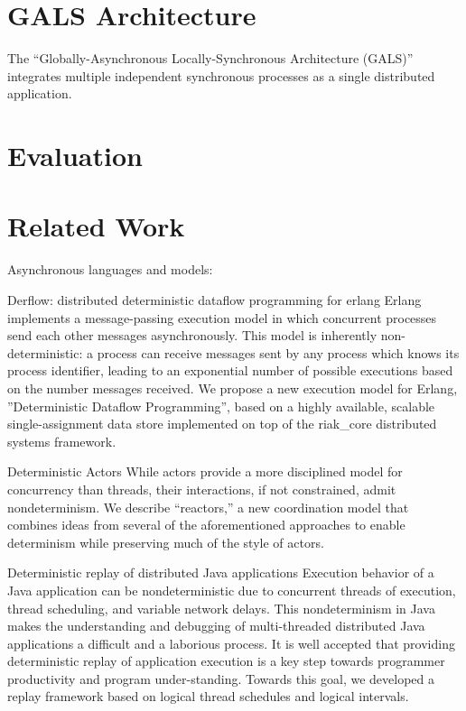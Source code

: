 \documentclass[sigplan,screen]{acmart}
\begin{document}
\section{GALS Architecture}

The ``Globally-Asynchronous Locally-Synchronous Architecture (GALS)''
integrates multiple independent synchronous processes as a single distributed
application.

\section{Evaluation}

\section{Related Work}

Asynchronous languages and models:

Derflow: distributed deterministic dataflow programming for erlang
Erlang implements a message-passing execution model in which concurrent processes send each other messages asynchronously. This model is inherently non-deterministic: a process can receive messages sent by any process which knows its process identifier, leading to an exponential number of possible executions based on the number messages received. 
We propose a new execution model for Erlang, ''Deterministic Dataflow Programming'', based on a highly available, scalable single-assignment data store implemented on top of the riak\_core distributed systems framework.

Deterministic Actors
While actors provide a more disciplined model for concurrency than threads, their interactions, if not constrained, admit nondeterminism.
 We describe “reactors,” a new coordination model that combines ideas from several of the aforementioned approaches to enable determinism while preserving much of the style of actors.

Deterministic replay of distributed Java applications
Execution behavior of a Java application can be nondeterministic due to concurrent threads of execution, thread scheduling, and variable network delays. This nondeterminism in Java makes the understanding and debugging of multi-threaded distributed Java applications a difficult and a laborious process.
It is well accepted that providing deterministic replay of application execution is a key step towards programmer productivity and program under-standing.
Towards this goal, we developed a replay framework based on logical thread schedules and logical intervals.
\end{document}
